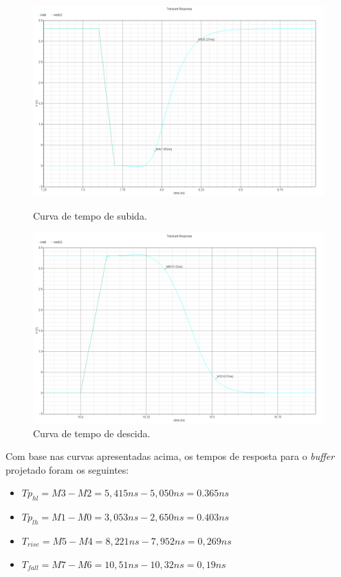 \documentclass[a4paper,10pt] {article}
\begin{document}
\begin{figure} [h]
	\begin{minipage} [b] {0.48 \linewidth}
		\includegraphics[scale=0.1]{Trans_rise.png}
		\centering
		\caption{Curva de tempo de subida.}
		\label{fig:rise}
	\end{minipage}
	\begin{minipage} [b] {0.48 \linewidth}
		\includegraphics[scale=0.1]{Trans_fall.png}
		\centering
		\caption{Curva de tempo de descida.}
		\label{fig:fall}
	\end{minipage}
\end{figure}

Com base nas curvas apresentadas acima, os tempos de resposta para o \textit{buffer} projetado foram os seguintes:

\begin{itemize}
\item $Tp_{hl}=M3-M2=5,415ns-5,050ns=0.365ns$
\item $Tp_{lh}=M1-M0=3,053ns-2,650ns=0.403ns$
\item $T_{rise}=M5-M4=8,221ns-7,952ns=0,269ns$
\item $T_{fall}=M7-M6=10,51ns-10,32ns=0,19ns$
\end{itemize}
\end{document}
